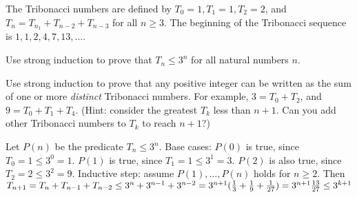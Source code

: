 \documentclass[solution, letterpaper]{cs20}
\begin{document}
\pagebreak


The Tribonacci numbers are defined by $T_0 = 1, T_1 = 1, T_2 = 2$, and $T_n = T_{n_1} + T_{n-2} + T_{n-3}$ for all $n \ge 3$. The beginning of the Tribonacci sequence is $1, 1, 2, 4, 7, 13, ...$. 

\subproblem Use strong induction to prove that $T_n \le 3^n$ for all natural numbers $n$.

\subproblem Use strong induction to prove that any positive integer can be written as the sum of one or more \textit{distinct} Tribonacci numbers. For example, $3 = T_0 + T_2$, and $9 = T_0 + T_1 + T_4$. (Hint: consider the greatest $T_k$ less than $n+1$. Can you add other Tribonacci numbers to $T_k$ to reach $n+1$?)

\begin{solution}
\subsolution 
Let $P(n)$ be the predicate $T_n \le 3^n$. Base cases: $P(0)$ is true, since $T_0 = 1 \le 3^0 = 1$. $P(1)$ is true, since $T_1 = 1 \le 3^1 = 3$. $P(2)$ is also true, since $T_2 = 2 \le 3^2 = 9$. Inductive step: assume $P(1), ..., P(n)$ holds for $n \ge 2$. Then 
\begin{math}
T_{n+1} = T_n + T_{n-1} + T_{n-2}
\\ \le 3^n + 3^{n-1} + 3^{n-2}
\\ = 3^{n+1}(\frac{1}{3} + \frac{1}{9} + \frac{1}{27})
\\ = 3^{n+1}\frac{13}{27}
\\ \le 3^{k+1}
\end{math}


\end{solution}
\end{document}
